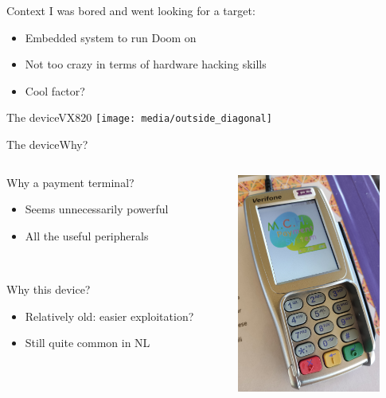 \documentclass[12pt,aspectratio=169]{beamer}
\begin{document}
\begin{frame}{Context}
I was bored and went looking for a target:
\begin{itemize}
	\item Embedded system to run Doom on
	\item Not too crazy in terms of hardware hacking skills
	\item Cool factor?
\end{itemize}
\end{frame}



\begin{frame}{The device}{VX820}
\centering
\texttt{[image: media/outside\_diagonal]}
\end{frame}

\begin{frame}{The device}{Why?}
\begin{columns}
	\begin{column}{0.5\textwidth}
		Why a payment terminal?
		\begin{itemize}
			\item Seems unnecessarily powerful
			\item All the useful peripherals
		\end{itemize}
		~

		Why this device?
		\begin{itemize}
			\item Relatively old: easier exploitation?
			\item Still quite common in NL
		\end{itemize}
	\end{column}
	\begin{column}{0.5\textwidth}
		\centering
		\includegraphics[width=4.7cm]{media/vx820_mch_bar}
	\end{column}
\end{columns}
\end{frame}
\end{document}
